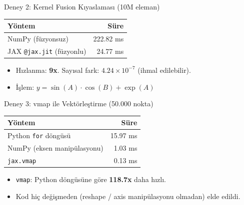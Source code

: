 \documentclass[aspectratio=169]{beamer}
\begin{document}
\begin{frame}{Deney 2: Kernel Fusion Kıyaslaması (10M eleman)}
  \begin{table}
    \small
    \begin{tabular}{@{}lr@{}}
      \toprule
      Yöntem & Süre \\
      \midrule
      NumPy (füzyonsuz) & 222.82 ms \\
      JAX \texttt{@jax.jit} (füzyonlu) & 24.77 ms \\
      \bottomrule
    \end{tabular}
  \end{table}
  \begin{itemize}
    \item Hızlanma: \textbf{9x}. Sayısal fark: $4.24 \times 10^{-7}$ (ihmal edilebilir).
    \item İşlem: $y = \sin(A)\cdot\cos(B) + \exp(A)$
  \end{itemize}
\end{frame}

\begin{frame}{Deney 3: vmap ile Vektörleştirme (50.000 nokta)}
  \begin{table}
    \small
    \begin{tabular}{@{}lr@{}}
      \toprule
      Yöntem & Süre \\
      \midrule
      Python \texttt{for} döngüsü & 15.97 ms \\
      NumPy (eksen manipülasyonu) & 1.03 ms \\
      \texttt{jax.vmap} & 0.13 ms \\
      \bottomrule
    \end{tabular}
  \end{table}
  \begin{itemize}
    \item \texttt{vmap}: Python döngüsüne göre \textbf{118.7x} daha hızlı.
    \item Kod hiç değişmeden (reshape / axis manipülasyonu olmadan) elde edildi.
  \end{itemize}
\end{frame}
\end{document}
